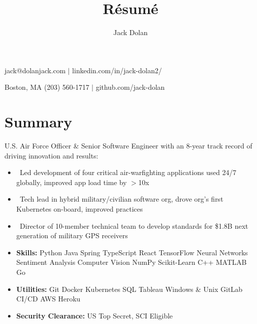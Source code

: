 \documentclass{article}
\makeatletter
\renewcommand{\maketitle}{ 
{\huge\bfseries\theauthor}\hfill jack@dolanjack.com $|$ linkedin.com/in/jack-dolan2/

\vspace{0.2em} 

Boston, MA \hfill (203) 560-1717 $|$ github.com/jack-dolan
}
\makeatother
\begin{document}
 
\title{R\'esum\'e} 
\author{Jack Dolan} 
\maketitle
{}


\section{Summary} 
U.S. Air Force Officer \& Senior Software Engineer with an 8-year track record of driving innovation and results:
    \begin{itemize}
    \itemsep0em
    \item \ Led development of four critical air-warfighting applications used 24/7 globally, improved app load time by $>$10x
    \item \ Tech lead in hybrid military/civilian software org, drove org’s first Kubernetes on-board, improved practices
    \item \ Director of 10-member technical team to develop standards for \$1.8B next generation of military GPS receivers
    \newline
    \item \textbf{Skills:} Python \text{\textbar} Java \text{\textbar} Spring \text{\textbar} TypeScript \text{\textbar} React \text{\textbar} TensorFlow \text{\textbar} Neural Networks \text{\textbar} Sentiment Analysis \text{\textbar} Computer Vision \text{\textbar} NumPy \text{\textbar} Scikit-Learn \text{\textbar} C++ \text{\textbar} MATLAB \text{\textbar} Go
    \item \textbf{Utilities:} Git \text{\textbar} Docker \text{\textbar} Kubernetes \text{\textbar} SQL \text{\textbar} Tableau \text{\textbar} Windows \& Unix \text{\textbar} GitLab CI/CD \text{\textbar} AWS \text{\textbar} Heroku
    \item \textbf{Security Clearance:} US Top Secret, SCI Eligible \end{itemize} 
\end{document}
